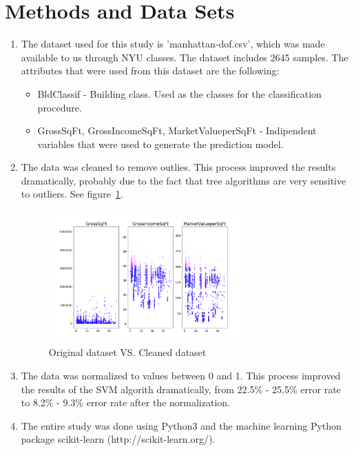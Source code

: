 \documentclass[10pt,twocolumn]{article}
\begin{document}
\section{Methods and Data Sets}
\begin{enumerate}

  \item The dataset used for this study is 'manhattan-dof.csv', which was made available to us through NYU classes. The dataset includes 2645 samples. The attributes that were used from this dataset are the following:
  \begin{itemize}
    \item BldClassif - Building class. Used as the classes for the classification procedure.
    \item GrossSqFt, GrossIncomeSqFt, MarketValueperSqFt - Indipendent variables that were used to generate the prediction model.
  \end{itemize}

  \item The data was cleaned to remove outlies. This process improved the results dramatically, probably due to the fact that tree algorithms are very sensitive to outliers. See figure~\ref{cleaning}.
    \begin{figure}[!b]
      \begin{center}
        \includegraphics[width=3in]{../plots/01.png}
      \end{center}
      \label{cleaning}
      \caption{\small Original dataset VS. Cleaned dataset}
    \end{figure}

  \item The data was normalized to values between 0 and 1. This process improved the results of the SVM algorith dramatically, from 22.5\% - 25.5\% error rate to 8.2\% - 9.3\% error rate after the normalization.

  \item The entire study was done using Python3 and the machine learning Python package scikit-learn (http://scikit-learn.org/).


\end{enumerate}
\end{document}
